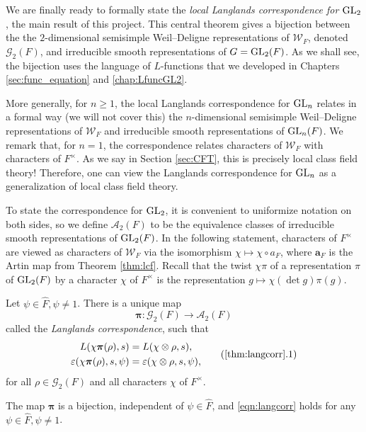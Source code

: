 We are finally ready to formally state the \textit{local Langlands correspondence for $\mathrm{GL}_2$}, the main result of this project. This central theorem gives a bijection between the the $2$-dimensional semisimple Weil--Deligne representations of $\mathcal{W}_F$, denoted $\mathcal{G}_2(F)$, and irreducible smooth representations of $G=\mathrm{GL}_2(F)$. As we shall see, the bijection uses the language of $L$-functions that we developed in Chapters \ref{sec:func_equation} and \ref{chap:LfuncGL2}. 

More generally, for $n\geq 1$, the local Langlands correspondence for $\mathrm{GL}_n$ relates in a formal way (we will not cover this) the $n$-dimensional semisimple Weil--Deligne representations of $\mathcal{W}_F$ and irreducible smooth representations of $\mathrm{GL}_n(F)$. We remark that, for $n=1$, the correspondence relates characters of $\mathcal{W}_F$ with characters of $F^\times$. As we say in Section \ref{sec:CFT}, this is precisely local class field theory! Therefore, one can view the Langlands correspondence for $\mathrm{GL}_n$ as a generalization of local class field theory.

To state the correspondence for $\mathrm{GL}_2$, it is convenient to uniformize notation on both sides, so we define $\mathcal{A}_2(F)$ to be the equivalence classes of irreducible smooth representations of $\mathrm{GL}_2(F)$. In the following statement, characters of $F^\times$ are viewed as characters of $\mathcal{W}_F$ via the isomorphism $\chi\mapsto\chi\circ a_F$, where $\mathbf{a}_F$ is the Artin map from Theorem \ref{thm:lcf}. Recall that the twist $\chi\pi$ of a representation $\pi$ of $\mathrm{GL}_2(F)$ by a character $\chi$ of $F^\times$ is the representation $g\mapsto \chi(\det g)\pi(g)$.


\begin{thm}\label{thm:langcorr}
    Let $\psi\in\hat{F},\psi\neq 1$. There is a unique map 
    $$\bm\pi:\mathcal{G}_2(F)\longrightarrow\mathcal{A}_2(F)$$
    called the \textit{Langlands correspondence}, such that 
    \begin{equation}
        \begin{split}
            L(\chi\bm\pi(\rho),s)&=L(\chi\otimes\rho,s),\\
            \varepsilon(\chi\bm\pi(\rho),s,\psi)&=\varepsilon(\chi\otimes\rho,s,\psi),
        \end{split}
        \label{eqn:langcorr}\tag{\ref{thm:langcorr}.1}
    \end{equation}
    for all $\rho\in\mathcal{G}_2(F)$ and all characters $\chi$ of $F^\times$.

    The map $\bm\pi$ is a bijection, independent of $\psi\in\hat{F}$, and \eqref{eqn:langcorr} holds for any $\psi\in\hat{F}, \psi\neq1$.
\end{thm}


